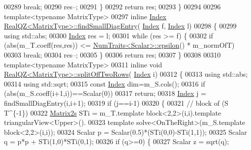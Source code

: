 \begin{DoxyCode}
00289           \textcolor{keywordflow}{break};
00290         res--;
00291       \}
00292       \textcolor{keywordflow}{return} res;
00293     \}
00294 
00296   \textcolor{keyword}{template}<\textcolor{keyword}{typename} MatrixType>
00297     \textcolor{keyword}{inline} \hyperlink{group___eigenvalues___module_a6201e534e901b5f4e66f72c176b534a3}{Index} \hyperlink{group___eigenvalues___module_class_eigen_1_1_real_q_z}{RealQZ<MatrixType>::findSmallDiagEntry}(
      \hyperlink{group___eigenvalues___module_a6201e534e901b5f4e66f72c176b534a3}{Index} f, \hyperlink{group___eigenvalues___module_a6201e534e901b5f4e66f72c176b534a3}{Index} l)
00298     \{
00299       \textcolor{keyword}{using} std::abs;
00300       \hyperlink{group___eigenvalues___module_a6201e534e901b5f4e66f72c176b534a3}{Index} res = l;
00301       \textcolor{keywordflow}{while} (res >= f) \{
00302         \textcolor{keywordflow}{if} (abs(m\_T.coeff(res,res)) <= \hyperlink{group___core___module_struct_eigen_1_1_num_traits}{NumTraits<Scalar>::epsilon}() * m\_normOfT)
00303           \textcolor{keywordflow}{break};
00304         res--;
00305       \}
00306       \textcolor{keywordflow}{return} res;
00307     \}
00308 
00310   \textcolor{keyword}{template}<\textcolor{keyword}{typename} MatrixType>
00311     \textcolor{keyword}{inline} \textcolor{keywordtype}{void} \hyperlink{group___eigenvalues___module_class_eigen_1_1_real_q_z}{RealQZ<MatrixType>::splitOffTwoRows}(
      \hyperlink{group___eigenvalues___module_a6201e534e901b5f4e66f72c176b534a3}{Index} i)
00312     \{
00313       \textcolor{keyword}{using} std::abs;
00314       \textcolor{keyword}{using} std::sqrt;
00315       \textcolor{keyword}{const} \hyperlink{group___eigenvalues___module_a6201e534e901b5f4e66f72c176b534a3}{Index} dim=m\_S.cols();
00316       \textcolor{keywordflow}{if} (abs(m\_S.coeff(i+1,i))==Scalar(0))
00317         \textcolor{keywordflow}{return};
00318       \hyperlink{group___eigenvalues___module_a6201e534e901b5f4e66f72c176b534a3}{Index} j = findSmallDiagEntry(i,i+1);
00319       \textcolor{keywordflow}{if} (j==i-1)
00320       \{
00321         \textcolor{comment}{// block of (S T^\{-1\})}
00322         \hyperlink{group___core___module_class_eigen_1_1_matrix}{Matrix2s} STi = m\_T.template block<2,2>(i,i).\textcolor{keyword}{template} triangularView<Upper>().
00323           \textcolor{keyword}{template} solve<OnTheRight>(m\_S.template block<2,2>(i,i));
00324         Scalar p = Scalar(0.5)*(STi(0,0)-STi(1,1));
00325         Scalar q = p*p + STi(1,0)*STi(0,1);
00326         \textcolor{keywordflow}{if} (q>=0) \{
00327           Scalar z = sqrt(q);

\end{DoxyCode}
